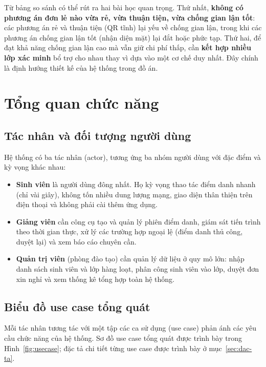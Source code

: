 \documentclass[../main.tex]{subfiles}
\begin{document}
Từ bảng so sánh có thể rút ra hai bài học quan trọng. Thứ nhất, \textbf{không có phương
án đơn lẻ nào vừa rẻ, vừa thuận tiện, vừa chống gian lận tốt}: các phương án rẻ và thuận
tiện (QR tĩnh) lại yếu về chống gian lận, trong khi các phương án chống gian lận tốt
(nhận diện mặt) lại đắt hoặc phức tạp. Thứ hai, để đạt khả năng chống gian lận cao mà
vẫn giữ chi phí thấp, cần \textbf{kết hợp nhiều lớp xác minh} bổ trợ cho nhau thay vì dựa
vào một cơ chế duy nhất. Đây chính là định hướng thiết kế của hệ thống trong đồ án.

\section{Tổng quan chức năng}
\label{sec:tong-quan-cn}

\subsection{Tác nhân và đối tượng người dùng}
\label{sec:doi-tuong}

Hệ thống có ba tác nhân (actor), tương ứng ba nhóm người dùng với đặc điểm và kỳ vọng
khác nhau:

\begin{itemize}[leftmargin=1.5em]
  \item \textbf{Sinh viên} là người dùng đông nhất. Họ kỳ vọng thao tác điểm danh nhanh
  (chỉ vài giây), không tốn nhiều dung lượng mạng, giao diện thân thiện trên điện thoại
  và không phải cài thêm ứng dụng.

  \item \textbf{Giảng viên} cần công cụ tạo và quản lý phiên điểm danh, giám sát tiến
  trình theo thời gian thực, xử lý các trường hợp ngoại lệ (điểm danh thủ công, duyệt
  lại) và xem báo cáo chuyên cần.

  \item \textbf{Quản trị viên} (phòng đào tạo) cần quản lý dữ liệu ở quy mô lớn: nhập
  danh sách sinh viên và lớp hàng loạt, phân công sinh viên vào lớp, duyệt đơn xin nghỉ
  và xem thống kê tổng hợp toàn hệ thống.
\end{itemize}

\subsection{Biểu đồ use case tổng quát}
\label{sec:use-case}

Mỗi tác nhân tương tác với một tập các ca sử dụng (use case) phản ánh các yêu cầu chức
năng của hệ thống. Sơ đồ use case tổng quát được trình bày trong Hình~\ref{fig:usecase};
đặc tả chi tiết từng use case được trình bày ở mục~\ref{sec:dac-ta}.
\end{document}
